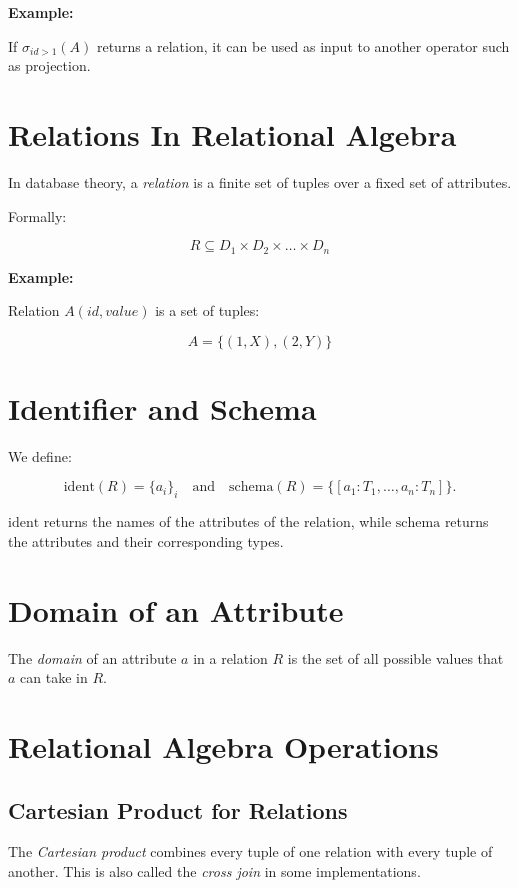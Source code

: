 \textbf{Example:}
  
If \(\sigma_{id > 1}(A)\) returns a relation, it can be used as input to another operator such as projection.

\section{Relations In Relational Algebra}

In database theory, a \emph{relation} is a finite set of tuples over a fixed set of attributes.

Formally:

\[
    R \subseteq D_1 \times D_2 \times \dots \times D_n
\]

\textbf{Example:}
  
Relation \(A(id, value)\) is a set of tuples:

\[
    A = \{(1, X), (2, Y)\}
\]

\section{Identifier and Schema}

We define:

\[
    \mathrm{ident}(R) = \{a_i\}_i \quad \text{and} \quad \mathrm{schema} (R) = \{[a_1:T_1, \dots, a_n:T_n]\}.
\]

\(\mathrm{ident}\) returns the names of the attributes of the relation, while \(\mathrm{schema}\) returns the attributes and their corresponding types.

\section{Domain of an Attribute}

The \emph{domain} of an attribute \(a\) in a relation \(R\) is the set of all possible values that \(a\) can take in \(R\).

\section{Relational Algebra Operations}

\subsection{Cartesian Product for Relations}

The \emph{Cartesian product} combines every tuple of one relation with every tuple of another.
This is also called the \emph{cross join} in some implementations.

